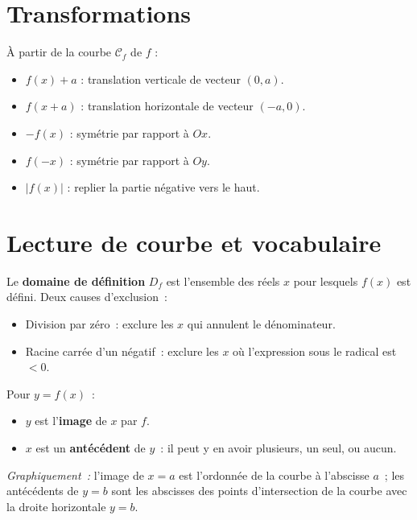 \section{Transformations}

\begin{prop}
\`A partir de la courbe $\mathcal{C}_f$ de $f$ :
\begin{itemize}
  \item $f(x)+a$ : translation verticale de vecteur $(0,a)$.
  \item $f(x+a)$ : translation horizontale de vecteur $(-a,0)$.
  \item $-f(x)$ : sym\'etrie par rapport \`a $Ox$.
  \item $f(-x)$ : sym\'etrie par rapport \`a $Oy$.
  \item $|f(x)|$ : replier la partie n\'egative vers le haut.
\end{itemize}
\end{prop}


\section{Lecture de courbe et vocabulaire}

\begin{defn}
Le \textbf{domaine de d\'efinition} $D_f$ est l'ensemble des r\'eels $x$
pour lesquels $f(x)$ est d\'efini. Deux causes d'exclusion~:
\begin{itemize}
  \item Division par z\'ero~: exclure les $x$ qui annulent le d\'enominateur.
  \item Racine carr\'ee d'un n\'egatif~: exclure les $x$ o\`u l'expression
        sous le radical est $<0$.
\end{itemize}
\end{defn}

\begin{defn}
Pour $y = f(x)$~:
\begin{itemize}
  \item $y$ est l'\textbf{image} de $x$ par $f$.
  \item $x$ est un \textbf{ant\'ec\'edent} de $y$~: il peut y en avoir
        plusieurs, un seul, ou aucun.
\end{itemize}
\emph{Graphiquement~:} l'image de $x=a$ est l'ordonn\'ee de la courbe
\`a l'abscisse $a$~; les ant\'ec\'edents de $y=b$ sont les abscisses
des points d'intersection de la courbe avec la droite horizontale $y=b$.
\end{defn}


